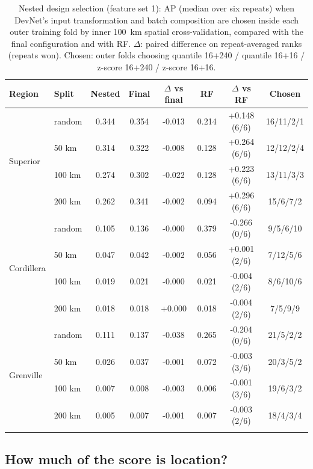 \documentclass[pdflatex,sn-apa]{sn-jnl}
\begin{document}
\begin{table}[t]
\caption{Nested design selection (feature set 1): AP (median over six repeats) when DevNet's input transformation and batch composition are chosen inside each outer training fold by inner 100~km spatial cross-validation, compared with the final configuration and with RF. $\Delta$: paired difference on repeat-averaged ranks (repeats won). Chosen: outer folds choosing quantile 16+240 / quantile 16+16 / z-score 16+240 / z-score 16+16.}\label{tab:nested}
\scriptsize
\setlength{\tabcolsep}{2.5pt}
\begin{tabular*}{\textwidth}{@{\extracolsep\fill}llcccccc}
\toprule
Region & Split & Nested & Final & $\Delta$ vs final & RF & $\Delta$ vs RF & Chosen \\
\midrule
\multirow{4}{*}{Superior} & random & 0.344 & 0.354 & -0.013 & 0.214 & +0.148 (6/6) & 16/11/2/1 \\
 & 50 km & 0.314 & 0.322 & -0.008 & 0.128 & +0.264 (6/6) & 12/12/2/4 \\
 & 100 km & 0.274 & 0.302 & -0.022 & 0.128 & +0.223 (6/6) & 13/11/3/3 \\
 & 200 km & 0.262 & 0.341 & -0.002 & 0.094 & +0.296 (6/6) & 15/6/7/2 \\
\midrule
\multirow{4}{*}{Cordillera} & random & 0.105 & 0.136 & -0.000 & 0.379 & -0.266 (0/6) & 9/5/6/10 \\
 & 50 km & 0.047 & 0.042 & -0.002 & 0.056 & +0.001 (2/6) & 7/12/5/6 \\
 & 100 km & 0.019 & 0.021 & -0.000 & 0.021 & -0.004 (2/6) & 8/6/10/6 \\
 & 200 km & 0.018 & 0.018 & +0.000 & 0.018 & -0.004 (2/6) & 7/5/9/9 \\
\midrule
\multirow{4}{*}{Grenville} & random & 0.111 & 0.137 & -0.038 & 0.265 & -0.204 (0/6) & 21/5/2/2 \\
 & 50 km & 0.026 & 0.037 & -0.001 & 0.072 & -0.003 (3/6) & 20/3/5/2 \\
 & 100 km & 0.007 & 0.008 & -0.003 & 0.006 & -0.001 (3/6) & 19/6/3/2 \\
 & 200 km & 0.005 & 0.007 & -0.001 & 0.007 & -0.003 (2/6) & 18/4/3/4 \\
\botrule
\end{tabular*}
\end{table}

\subsection{How much of the score is location?}\label{sec:res-geography}
\end{document}
